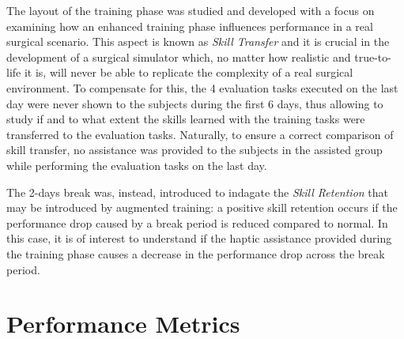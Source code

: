 \documentclass[../main.tex]{subfiles}
\begin{document}
The layout of the training phase was studied and developed with a focus on examining how an enhanced training phase influences performance in a real surgical scenario. This aspect is known as \textit{Skill Transfer} and it is crucial in the development of a surgical simulator which, no matter how realistic and true-to-life it is, will never be able to replicate the complexity of a real surgical environment. To compensate for this, the 4 evaluation tasks executed on the last day were never shown to the subjects during the first 6 days, thus allowing to study if and to what extent the skills learned with the training tasks were transferred to the evaluation tasks. Naturally, to ensure a correct comparison of skill transfer, no assistance was provided to the subjects in the assisted group while performing the evaluation tasks on the last day.

The 2-days break was, instead, introduced to indagate the \textit{Skill Retention} that may be introduced by augmented training: a positive skill retention occurs if the performance drop caused by a break period is reduced compared to normal. In this case, it is of interest to understand if the haptic assistance provided during the training phase causes a decrease in the performance drop across the break period.

\section{Performance Metrics}   




\end{document}
